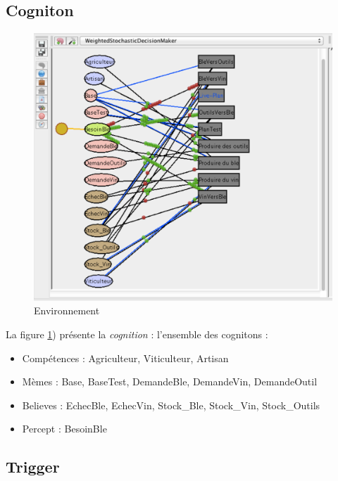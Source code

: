 \documentclass[a4paper,oneside,12 pt]{article}
\begin{document}
\subsection{Cogniton}

\begin{figure}[!ht]
\begin{center}
\includegraphics[scale=0.5]{CoPl2.pdf}
\caption[CP2]{Environnement \\}
\label{CP2}
\end{center}
\end{figure} 

La figure \ref{CP2}) présente la \textit{cognition} : l'ensemble des cognitons :

\begin{itemize}
\item Compétences : Agriculteur, Viticulteur, Artisan
\item Mèmes : Base, BaseTest, DemandeBle, DemandeVin, DemandeOutil
\item Believes : EchecBle, EchecVin, Stock\_Ble, Stock\_Vin, Stock\_Outils
\item Percept : BesoinBle

\end{itemize}

\subsection{Trigger}
\end{document}
